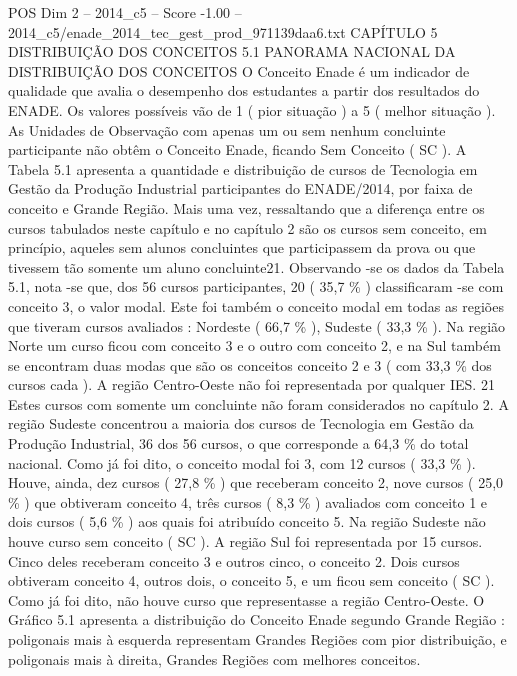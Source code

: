 \begin{textsample}{POS Dim 2 – 2014\_c5 – Score -1.00 – 2014\_c5/enade\_2014\_tec\_gest\_prod\_971139daa6.txt}  \label{ex:f2_pos_305}
CAPÍTULO 5 DISTRIBUIÇÃO DOS CONCEITOS 5.1 PANORAMA NACIONAL DA DISTRIBUIÇÃO DOS CONCEITOS O Conceito Enade é um indicador de qualidade que avalia o desempenho dos estudantes a partir dos resultados do ENADE.
Os valores possíveis vão de 1 ( pior situação ) a 5 ( melhor situação ).
As Unidades de Observação com apenas um ou sem nenhum concluinte participante não obtêm o Conceito Enade, ficando Sem Conceito ( SC ).
A Tabela 5.1 apresenta a quantidade e distribuição de cursos de Tecnologia em Gestão da Produção Industrial participantes do ENADE/2014, por faixa de conceito e Grande Região.
Mais uma vez, ressaltando que a diferença entre os cursos tabulados neste capítulo e no capítulo 2 são os cursos sem conceito, em princípio, aqueles sem alunos concluintes que participassem da prova ou que tivessem tão somente um aluno concluinte21.
Observando -se os dados da Tabela 5.1, nota -se que, dos 56 cursos participantes, 20 ( 35,7 \% ) classificaram -se com conceito 3, o valor modal.
Este foi também o conceito modal em todas as regiões que tiveram cursos avaliados : Nordeste ( 66,7 \% ), Sudeste ( 33,3 \% ).
Na região Norte um curso ficou com conceito 3 e o outro com conceito 2, e na Sul também se encontram duas modas que são os conceitos conceito 2 e 3 ( com 33,3 \% dos cursos cada ).
A região Centro-Oeste não foi representada por qualquer IES. 21 Estes cursos com somente um concluinte não foram considerados no capítulo 2.
A região Sudeste concentrou a maioria dos cursos de Tecnologia em Gestão da Produção Industrial, 36 dos 56 cursos, o que corresponde a 64,3 \% do total nacional.
Como já foi dito, o conceito modal foi 3, com 12 cursos ( 33,3 \% ).
Houve, ainda, dez cursos ( 27,8 \% ) que receberam conceito 2, nove cursos ( 25,0 \% ) que obtiveram conceito 4, três cursos ( 8,3 \% ) avaliados com conceito 1 e dois cursos ( 5,6 \% ) aos quais foi atribuído conceito 5.
Na região Sudeste não houve curso sem conceito ( SC ).
A região Sul foi representada por 15 cursos.
Cinco deles receberam conceito 3 e outros cinco, o conceito 2.
Dois cursos obtiveram conceito 4, outros dois, o conceito 5, e um ficou sem conceito ( SC ).
Como já foi dito, não houve curso que representasse a região Centro-Oeste.
O Gráfico 5.1 apresenta a distribuição do Conceito Enade segundo Grande Região : poligonais mais à esquerda representam Grandes Regiões com pior distribuição, e poligonais mais à direita, Grandes Regiões com melhores conceitos.

\end{textsample}
